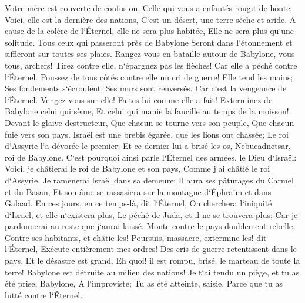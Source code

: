 \verse Votre mère est couverte de confusion, Celle qui vous a enfantés rougit de honte; Voici, elle est la dernière des nations, C`est un désert, une terre sèche et aride. 
\verse A cause de la colère de l`Éternel, elle ne sera plus habitée, Elle ne sera plus qu`une solitude. Tous ceux qui passeront près de Babylone Seront dans l`étonnement et siffleront sur toutes ses plaies. 
\verse Rangez-vous en bataille autour de Babylone, vous tous, archers! Tirez contre elle, n`épargnez pas les flèches! Car elle a péché contre l`Éternel. 
\verse Poussez de tous côtés contre elle un cri de guerre! Elle tend les mains; Ses fondements s`écroulent; Ses murs sont renversés. Car c`est la vengeance de l`Éternel. Vengez-vous sur elle! Faites-lui comme elle a fait! 
\verse Exterminez de Babylone celui qui sème, Et celui qui manie la faucille au temps de la moisson! Devant le glaive destructeur, Que chacun se tourne vers son peuple, Que chacun fuie vers son pays. 
\verse Israël est une brebis égarée, que les lions ont chassée; Le roi d`Assyrie l`a dévorée le premier; Et ce dernier lui a brisé les os, Nebucadnetsar, roi de Babylone. 
\verse C`est pourquoi ainsi parle l`Éternel des armées, le Dieu d`Israël: Voici, je châtierai le roi de Babylone et son pays, Comme j`ai châtié le roi d`Assyrie. 
\verse Je ramènerai Israël dans sa demeure; Il aura ses pâturages du Carmel et du Basan, Et son âme se rassasiera sur la montagne d`Éphraïm et dans Galaad. 
\verse En ces jours, en ce temps-là, dit l`Éternel, On cherchera l`iniquité d`Israël, et elle n`existera plus, Le péché de Juda, et il ne se trouvera plus; Car je pardonnerai au reste que j`aurai laissé. 
\verse Monte contre le pays doublement rebelle, Contre ses habitants, et châtie-les! Poursuis, massacre, extermine-les! dit l`Éternel, Exécute entièrement mes ordres! 
\verse Des cris de guerre retentissent dans le pays, Et le désastre est grand. 
\verse Eh quoi! il est rompu, brisé, le marteau de toute la terre! Babylone est détruite au milieu des nations! 
\verse Je t`ai tendu un piège, et tu as été prise, Babylone, A l`improviste; Tu as été atteinte, saisie, Parce que tu as lutté contre l`Éternel. 
